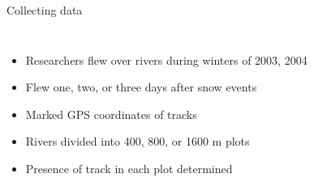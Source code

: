 \documentclass{beamer}
\begin{document}
\begin{frame}{Collecting data}
	\begin{columns}
		\column{5cm}
		\column{5cm}
		\begin{itemize}[<+->]
			\item Researchers flew over rivers during winters of 2003, 2004
			\item Flew one, two, or three days after snow events
			\item Marked GPS coordinates of tracks
			\item Rivers divided into 400, 800, or 1600 m plots
			\item Presence of track in each plot determined
		\end{itemize}
	\end{columns}
\end{frame}

{
	\begin{frame}{}
	\end{frame}
}
\end{document}
